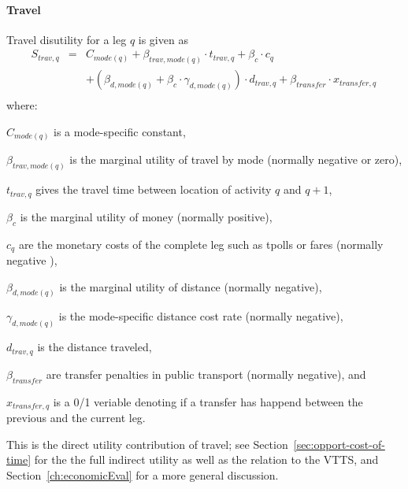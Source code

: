 \paragraph{Travel} 


Travel disutility for a leg $q$ is given as 
\begin{equation}
\label{eq:tdisutility}
\begin{matrix}
S_{trav, q} & = & C_{mode(q)} + \beta_{trav, mode(q)} \cdot t_{trav, q} + \beta_{c} \cdot c_q  
\\ & & + (\beta_{d, mode(q)} + \beta_{c} \cdot \gamma_{d, mode(q)}) \cdot d_{trav,q} 
%
+ \beta_{transfer} \cdot x_{transfer,q} \, \\
\end{matrix}
\end{equation} 
where:
\begin{compactitem} 
\item $C_{mode(q)}$ is a mode-specific constant,
\item $\beta_{trav, mode(q)}$ is the marginal utility of travel by mode (normally negative or zero),
\item $t_{trav, q}$ gives the travel time between location of activity $q$ and $q+1$,
\item $\beta_{c}$ is the marginal utility of money (normally positive),
\item $c_q$ are the monetary costs of the complete leg such as tpolls or fares (normally negative ),
\item $\beta_{d, mode(q)}$ is the  marginal utility of distance (normally negative),
\item $\gamma_{d, mode(q)}$ is the mode-specific distance cost rate (normally negative),
\item $d_{trav, q}$ is the distance traveled, 
\item $\beta_{transfer}$ are transfer penalties in public transport (normally negative),
and
\item $x_{transfer,q}$ is a 0/1 veriable denoting if a transfer has happend between the previous and the current leg.
\end{compactitem}
This is the direct utility contribution of travel; see Section~\ref{sec:opport-cost-of-time} for the the full indirect utility as well as the relation to the VTTS, and Section~\ref{ch:economicEval} for a more general discussion.

